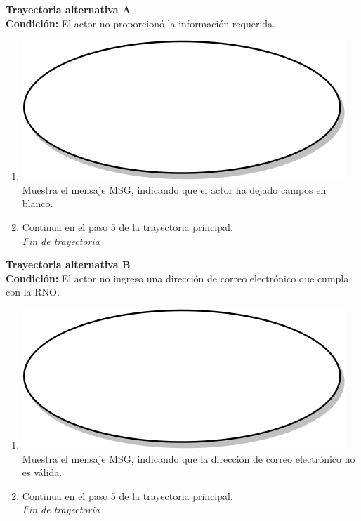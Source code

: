 \textbf{Trayectoria alternativa A} \label{cu2_ta_a} \\
\textbf{Condición:} El actor no proporcionó la información requerida.\\
 \begin{enumerate}[label=A\arabic*]
    \item {\includegraphics[scale=.05]{Capitulo3/img/proceso.png} Muestra el mensaje MSG, indicando que el actor ha dejado campos en blanco.}
    \item {Continua en el paso 5 de la trayectoria principal.} \\
    \textit{Fin de trayectoria} \\
\end{enumerate}

\textbf{Trayectoria alternativa B} \label{cu2_ta_b}\\
\textbf{Condición:} El actor no ingreso una dirección de correo electrónico que cumpla con la RNO.\\
 \begin{enumerate}[label=B\arabic*]
    \item {\includegraphics[scale=.05]{Capitulo3/img/proceso.png} Muestra el mensaje MSG, indicando que la dirección de correo electrónico no es válida.}
    \item {Continua en el paso 5 de la trayectoria principal.} \\
    \textit{Fin de trayectoria} \\
\end{enumerate}

